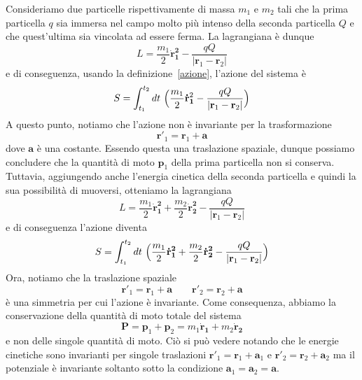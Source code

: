 \begin{example} 
    Consideriamo due particelle rispettivamente di massa $m_1$ e $m_2$ tali che la prima particella $q$ sia immersa nel campo molto più intenso della seconda particella $Q$ e che quest'ultima sia vincolata ad essere ferma. La lagrangiana è dunque 
\begin{equation}
    L = \frac{m_1}{2} \mathbf{\dot r_1^2} - \frac{qQ}{|\mathbf r_1 - \mathbf r_2|}
\end{equation}
    e di conseguenza, usando la definizione~\eqref{azione}, l'azione del sistema è
\begin{equation}
    S = \int_{t_1}^{t_2}dt~ \Big( \frac{m_1}{2} \mathbf{\dot r_1}^2- \frac{qQ}{|\mathbf r_1 - \mathbf r_2|} \Big)
\end{equation}
    A questo punto, notiamo che l'azione non è invariante per la trasformazione 
\begin{equation}
    \mathbf r'_1 = \mathbf r_1 + \mathbf a
\end{equation}
    dove $\mathbf a$ è una costante. Essendo questa una traslazione spaziale, dunque possiamo concludere che la quantità di moto $\mathbf p_1$ della prima particella non si conserva. Tuttavia, aggiungendo anche l'energia cinetica della seconda particella e quindi la sua possibilità di muoversi, otteniamo la lagrangiana  
\begin{equation}
    L = \frac{m_1}{2} \mathbf{\dot r_1^2} + \frac{m_2}{2} \mathbf{\dot r_2^2} - \frac{qQ}{|\mathbf r_1 - \mathbf r_2|}
\end{equation}
    e di conseguenza l'azione diventa
\begin{equation}
    S = \int_{t_1}^{t_2}dt~ \Big( \frac{m_1}{2} \mathbf{\dot r_1^2} + \frac{m_2}{2} \mathbf{\dot r_2^2} - \frac{qQ}{|\mathbf r_1 - \mathbf r_2|} \Big)
\end{equation}
    Ora, notiamo che la traslazione spaziale 
\begin{equation}
    \mathbf r'_1 = \mathbf r_1 + \mathbf a \qquad \mathbf r'_2 = \mathbf r_2 + \mathbf a
\end{equation}
    è una simmetria per cui l'azione è invariante. Come consequenza, abbiamo la conservazione della quantità di moto totale del sistema
\begin{equation*}
    \mathbf P = \mathbf p_1 + \mathbf p_2 = m_1 \mathbf{\dot r_1} + m_2 \mathbf{\dot r_2}
\end{equation*}
    e non delle singole quantità di moto. Ciò si può vedere notando che le energie cinetiche sono invarianti per singole traslazioni $\mathbf r'_1 = \mathbf r_1 + \mathbf a_1$ e $\mathbf r'_2 = \mathbf r_2 + \mathbf a_2$ ma il potenziale è invariante soltanto sotto la condizione $\mathbf a_1 = \mathbf a_2 = \mathbf a$.
\end{example}

